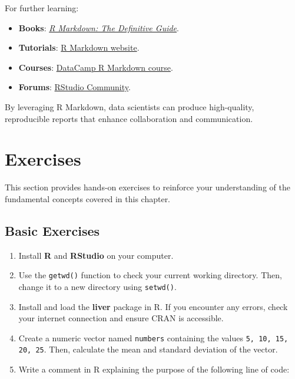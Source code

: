 \documentclass[
]{book}
\newcommand{\passthrough}[1]{#1}
\providecommand{\tightlist}{%
  \setlength{\itemsep}{0pt}\setlength{\parskip}{0pt}}
\theoremstyle{definition}
\theoremstyle{definition}
\theoremstyle{definition}
\theoremstyle{definition}
\theoremstyle{remark}
\begin{document}
For further learning:

\begin{itemize}
\tightlist
\item
  \textbf{Books}: \href{https://bookdown.org/yihui/rmarkdown/}{\emph{R Markdown: The Definitive Guide}}.\\
\item
  \textbf{Tutorials}: \href{https://rmarkdown.rstudio.com/lesson-1.html}{R Markdown website}.\\
\item
  \textbf{Courses}: \href{https://www.datacamp.com/courses/reporting-with-r-markdown}{DataCamp R Markdown course}.\\
\item
  \textbf{Forums}: \href{https://community.rstudio.com/c/rmarkdown/9}{RStudio Community}.
\end{itemize}

By leveraging R Markdown, data scientists can produce high-quality, reproducible reports that enhance collaboration and communication.

\section{Exercises}\label{exercises}

This section provides hands-on exercises to reinforce your understanding of the fundamental concepts covered in this chapter.

\subsection*{Basic Exercises}\label{basic-exercises}

\begin{enumerate}
\def\labelenumi{\arabic{enumi}.}
\tightlist
\item
  Install \textbf{R} and \textbf{RStudio} on your computer.\\
\item
  Use the \passthrough{\lstinline!getwd()!} function to check your current working directory. Then, change it to a new directory using \passthrough{\lstinline!setwd()!}.\\
\item
  Install and load the \textbf{liver} package in R. If you encounter any errors, check your internet connection and ensure CRAN is accessible.\\
\item
  Create a numeric vector named \passthrough{\lstinline!numbers!} containing the values \passthrough{\lstinline!5, 10, 15, 20, 25!}. Then, calculate the mean and standard deviation of the vector.\\
\item
  Write a comment in R explaining the purpose of the following line of code:
\end{enumerate}
\end{document}
